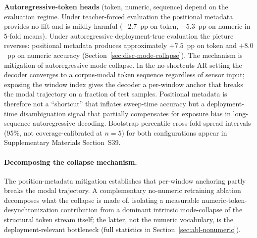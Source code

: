 \documentclass[sensors,article,submit,moreauthors,pdftex]{Definitions/mdpi}
\begin{document}
\textbf{Autoregressive-token heads} (token, numeric, sequence) depend on the evaluation regime. Under teacher-forced evaluation the positional metadata provides no lift and is mildly harmful ($-2.7$~pp on token, $-5.3$~pp on numeric in 5-fold means). Under autoregressive deployment-true evaluation the picture reverses: positional metadata produces approximately $+7.5$~pp on token and $+8.0$~pp on numeric accuracy (Section~\ref{sec:disc-mode-collapse}). The mechanism is mitigation of autoregressive mode collapse. In the no-shortcuts AR setting the decoder converges to a corpus-modal token sequence regardless of sensor input; exposing the window index gives the decoder a per-window anchor that breaks the modal trajectory on a fraction of test samples. Positional metadata is therefore not a ``shortcut'' that inflates sweep-time accuracy but a deployment-time disambiguation signal that partially compensates for exposure bias in long-sequence autoregressive decoding. Bootstrap percentile cross-fold spread intervals (95\%, not coverage-calibrated at $n\!=\!5$) for both configurations appear in Supplementary Materials Section~S39.

\paragraph{Decomposing the collapse mechanism.} The position-metadata mitigation establishes that per-window anchoring partly breaks the modal trajectory. A complementary no-numeric retraining ablation decomposes what the collapse is made of, isolating a measurable numeric-token-desynchronization contribution from a dominant intrinsic mode-collapse of the structural token stream itself; the latter, not the numeric vocabulary, is the deployment-relevant bottleneck (full statistics in Section~\ref{sec:abl-nonumeric}).
\end{document}
